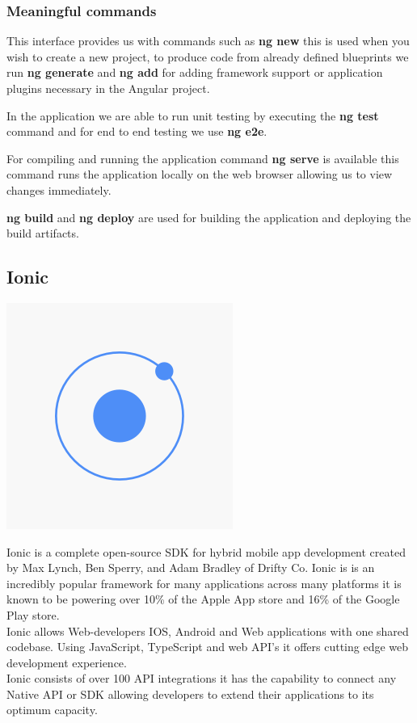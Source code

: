\documentclass[a4paper,12pt]{report}
\begin{document}
\subsubsection{Meaningful commands}

This interface provides us with commands such as \textbf{ng new} this is used when you wish to create a new project, to produce code from already defined blueprints we run \textbf{ng generate} and \textbf{ng add} for adding framework support or application plugins necessary in the Angular project.

In the application we are able to run unit testing by executing the \textbf{ng test} command and for end to end testing we use \textbf{ng e2e}.

For compiling and running the application command \textbf{ng serve} is available this command runs the application locally on the web browser allowing us to view changes immediately.

\textbf{ng build} and \textbf{ng deploy} are used for building the application and deploying the build artifacts.\cite{angularGuide} 

\subsection{Ionic}
\includegraphics[scale=.1]{images/ionic.png}

Ionic is a complete open-source SDK for hybrid mobile app development created by Max Lynch, Ben Sperry, and Adam Bradley of Drifty Co.
Ionic is is an incredibly popular framework for many applications across many platforms it is known to be powering over 10\% of the Apple App store and 16\% of the Google Play store.\\
Ionic allows Web-developers IOS, Android and Web applications with one shared codebase. Using JavaScript, TypeScript and web API's it offers cutting edge web development experience.\\
Ionic consists of over 100 API integrations it has the capability to connect any Native API or SDK allowing developers to extend their applications to its optimum capacity.\cite{ionicInsight}\\
\end{document}
